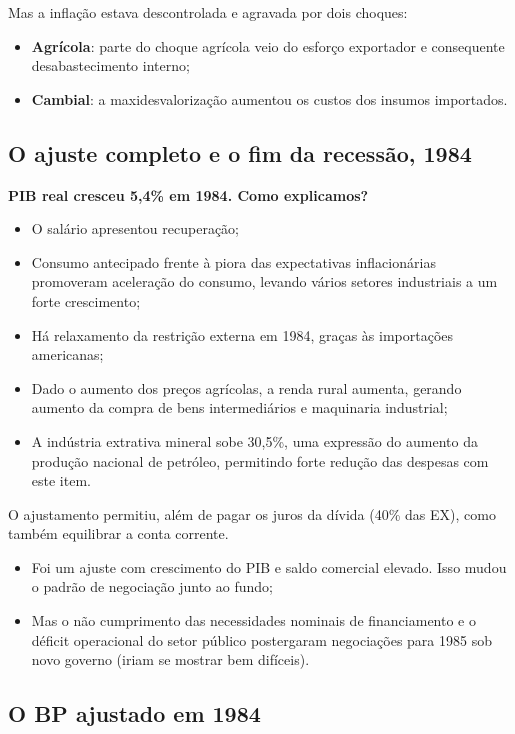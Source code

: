 \documentclass[a4paper,12pt]{article}[abntex2]
\begin{document}
Mas a inflação estava descontrolada e agravada por dois choques:
\begin{itemize}
    \item \textbf{Agrícola}: parte do choque agrícola veio do esforço exportador e consequente desabastecimento interno;
    \item \textbf{Cambial}: a maxidesvalorização aumentou os custos dos insumos importados.
\end{itemize}

\subsection{\textbf{O ajuste completo e o fim da recessão, 1984}}

\textbf{PIB real cresceu 5,4\% em 1984. Como explicamos?}

\begin{itemize}
    \item O salário apresentou recuperação;
    \item Consumo antecipado frente à piora das expectativas inflacionárias promoveram aceleração do consumo, levando vários setores industriais a um forte crescimento;
    \item Há relaxamento da restrição externa em 1984, graças às importações americanas;
    \item Dado o aumento dos preços agrícolas, a renda rural aumenta, gerando aumento da compra de bens intermediários e maquinaria industrial;
    \item A indústria extrativa mineral sobe 30,5\%, uma expressão do aumento da produção nacional de petróleo, permitindo forte redução das despesas com este item.
\end{itemize}

O ajustamento permitiu, além de pagar os juros da dívida (40\% das EX), como também equilibrar a conta corrente.

\begin{itemize}
    \item Foi um ajuste com crescimento do PIB e saldo comercial elevado. Isso mudou o padrão de negociação junto ao fundo;
    \item Mas o não cumprimento das necessidades nominais de financiamento e o déficit operacional do setor público postergaram negociações para 1985 sob novo governo (iriam se mostrar bem difíceis).
\end{itemize}

\subsection{\textbf{O BP ajustado em 1984}}
\end{document}
